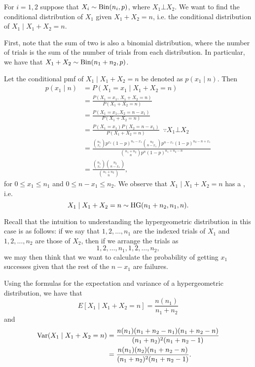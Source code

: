 \documentclass[notoc,notitlepage]{tufte-book}
\begin{document}
\begin{eg}
  For $i = 1, 2$ suppose that $X_i \sim \operatorname{Bin}(n_i, p)$, where $X_1 \bot X_2$. We
  want to find the conditional distribution of $X_1$ given $X_1 + X_2 = n$, i.e.
  the conditional distribution of $X_1 \mid X_1 + X_2 = n$.

  First, note that the sum of two  is also a
  binomial distribution, where the number of trials is the sum of the number of
  trials from each distribution. In particular, we have that $X_1 + X_2 \sim
  \operatorname{Bin}(n_1 + n_2, p)$.

  Let the conditional pmf of $X_1 \mid X_1 + X_2 = n$ be denoted as $p(x_1 \mid
  n)$. Then
  \begin{align*}
    p(x_1 \mid n) &= P(X_1 = x_1 \mid X_1 + X_2 = n) \\
                  &= \frac{P(X_1 = x_1, \, X_1 + X_2 = n)}{P(X_1 + X_2 = n)} \\
                  &= \frac{P(X_1 = x_1, X_2 = n - x_1)}{P(X_1 + X_2 = n)} \\
                  &= \frac{P(X_1 = x_1)P(X_2 = n - x_1)}{P(X_1 + X_2 = n)}
                  \enspace \because X_1 \bot X_2 \\
                  &= \frac{\binom{n_1}{x_1}p^{x_1}(1-p)^{n_1 - x_1}
                    \binom{n_2}{n - x_1}p^{n - x_1}(1-p)^{n_2 - n +
                    x_1}}{\binom{n_1 + n_2}{n}p^{n}(1-p)^{n_1 + n_2 - n}} \\
                  &= \frac{\binom{n_1}{x_1} \binom{n_2}{n - x_1}}{\binom{n_1 +
                    n_2}{n}},
  \end{align*}
  for $0 \leq x_1 \leq n_1$ and $0 \leq n - x_1 \leq n_2$. We observe that $X_1
  \mid X_1 + X_2 = n$ has a , i.e.
  \begin{equation*}
    X_1 \mid X_1 + X_2 = n \sim \operatorname{HG}(n_1 + n_2, n_1, n).
  \end{equation*}

  Recall that the intuition to understanding the hypergeometric distribution in
  this case is as follows: if we say that $1, 2, \ldots, n_1$ are the indexed
  trials of $X_1$ and $1, 2, \ldots, n_2$ are those of $X_2$, then if we arrange
  the trials as
  \begin{equation*}
    1, 2, \ldots, n_1, 1, 2, \ldots, n_2,
  \end{equation*}
  we may then think that we want to calculate the probability of getting $x_1$ 
  successes given that the rest of the $n - x_1$ are failures.

  Using the formulas for the expectation and variance of a hypergeometric
  distribution, we have that
  \begin{equation*}
    E[X_1 \mid X_1 + X_2 = n] = \frac{n(n_1)}{n_1 + n_2}
  \end{equation*}
  and
  \begin{align*}
    \operatorname{Var}(X_1 \mid X_1 + X_2 = n)
    &= \frac{n(n_1)(n_1 + n_2 - n_1)(n_1 + n_2 - n)}{(n_1 + n_2)^2(n_1 + n_2 -
      1)} \\
    &= \frac{n(n_1)(n_2)(n_1 + n_2 - n)}{(n_1 + n_2)^2(n_1 + n_2 - 1)}.
  \end{align*}
\end{eg}
\end{document}
